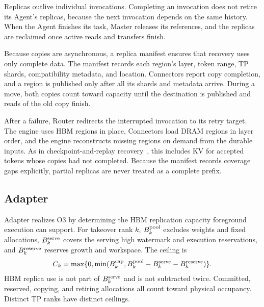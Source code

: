 Replicas outlive individual invocations. Completing an invocation does
not retire its Agent's replicas, because the next invocation depends on
the same history. When the Agent finishes its task, Master releases its
references, and the replicas are reclaimed once active reads and
transfers finish.

Because copies are asynchronous, a replica manifest ensures that
recovery uses only complete data. The manifest records each region's
layer, token range, TP shards, compatibility metadata, and location.
Connectors report copy completion, and a region is published only after
all its shards and metadata arrive. During a move, both copies count
toward capacity until the destination is published and reads of the old
copy finish.

After a failure, Router redirects the interrupted invocation to its
retry target. The engine uses HBM regions in place, Connectors load DRAM
regions in layer order, and the engine reconstructs missing regions on
demand from the durable inputs. As in checkpoint-and-replay
recovery~\cite{strati2024dejavu,cao2026lumen}, this includes KV for
accepted tokens whose copies had not completed.
Because the manifest records coverage gaps explicitly, partial replicas
are never treated as a complete prefix.

\subsection{Adapter}
\label{sec:capacity}

Adapter realizes O3 by determining the HBM replication capacity
foreground execution can support. For takeover rank $k$,
$B^{\rm pool}_k$ excludes weights and fixed allocations,
$B^{\rm serve}_k$ covers the serving high watermark and execution
reservations, and $B^{\rm reserve}_k$ reserves growth and workspace.
The ceiling is
\begin{equation}
 C_k=\max\{0,\min(B^{\rm cap}_k,
 B^{\rm pool}_k-B^{\rm serve}_k-B^{\rm reserve}_k)\}.
 \label{eq:ceiling}
\end{equation}
HBM replica use is not part of $B^{\rm serve}_k$ and is not subtracted twice.
Committed, reserved, copying, and retiring allocations all count toward
physical occupancy. Distinct TP ranks have distinct ceilings.

